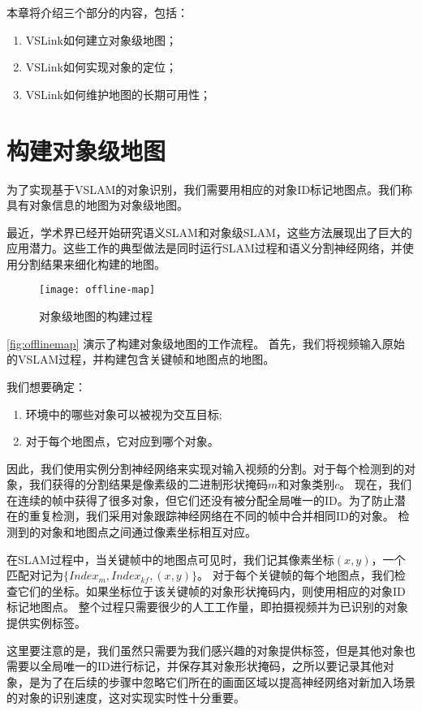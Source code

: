 本章将介绍三个部分的内容，包括：
\begin{enumerate}
	\item VSLink如何建立对象级地图；
	\item VSLink如何实现对象的定位；
	\item VSLink如何维护地图的长期可用性；
\end{enumerate}

\section{构建对象级地图}
\label{sec:map}
为了实现基于VSLAM的对象识别，我们需要用相应的对象ID标记地图点。我们称具有对象信息的地图为对象级地图。

最近，学术界已经开始研究语义SLAM\cite{bowman2017probabilistic,kaneko2018mask}和对象级SLAM\cite{mccormac2018fusion++,strecke2019fusion}，这些方法展现出了巨大的应用潜力。这些工作的典型做法是同时运行SLAM过程和语义分割神经网络，并使用分割结果来细化构建的地图。

\begin{figure}[htbp]
	\centering
	\texttt{[image: offline-map]}
	\caption{对象级地图的构建过程}
	\label{fig:offlinemap}
\end{figure}

\autoref{fig:offlinemap} 演示了构建对象级地图的工作流程。
首先，我们将视频输入原始的VSLAM过程\cite{mur2017orb}，并构建包含关键帧和地图点的地图。

我们想要确定：
\begin{enumerate}
	\item 环境中的哪些对象可以被视为交互目标;
	\item 对于每个地图点，它对应到哪个对象。
\end{enumerate}

因此，我们使用实例分割神经网络\cite{He_2017_ICCV}来实现对输入视频的分割。对于每个检测到的对象，我们获得的分割结果是像素级的二进制形状掩码$m$和对象类别$c$。
现在，我们在连续的帧中获得了很多对象，但它们还没有被分配全局唯一的ID。为了防止潜在的重复检测，我们采用对象跟踪神经网络在不同的帧中合并相同ID的对象。
检测到的对象和地图点之间通过像素坐标相互对应。

在SLAM过程中，当关键帧中的地图点可见时，我们记其像素坐标$(x,y)$，一个匹配对记为$\{Index_m,Index_{kf}, (x,y)\}$。
对于每个关键帧的每个地图点，我们检查它们的坐标。如果坐标位于该关键帧的对象形状掩码内，则使用相应的对象ID标记地图点。
整个过程只需要很少的人工工作量，即拍摄视频并为已识别的对象提供实例标签。

这里要注意的是，我们虽然只需要为我们感兴趣的对象提供标签，但是其他对象也需要以全局唯一的ID进行标记，并保存其对象形状掩码，之所以要记录其他对象，是为了在后续的步骤中忽略它们所在的画面区域以提高神经网络对新加入场景的对象的识别速度，这对实现实时性十分重要。

